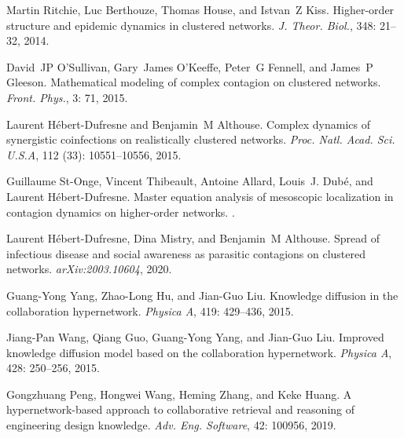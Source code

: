 Martin Ritchie, Luc Berthouze, Thomas House, and Istvan~Z Kiss.
\newblock Higher-order structure and epidemic dynamics in clustered networks.
\newblock \emph{J. Theor. Biol.}, 348: 21--32, 2014.

David~JP O'Sullivan, Gary~James O'Keeffe, Peter~G Fennell, and James~P Gleeson.
\newblock Mathematical modeling of complex contagion on clustered networks.
\newblock \emph{Front. Phys.}, 3: 71, 2015.

Laurent H{\'e}bert-Dufresne and Benjamin~M Althouse.
\newblock Complex dynamics of synergistic coinfections on realistically
clustered networks.
\newblock \emph{Proc. Natl. Acad. Sci. U.S.A}, 112 (33):
10551--10556, 2015.

Guillaume {St-Onge}, Vincent Thibeault, Antoine Allard, Louis~J. Dub{\'e}, and
Laurent {H{\'e}bert-Dufresne}.
\newblock Master equation analysis of mesoscopic localization in contagion
dynamics on higher-order networks.
.

Laurent H{\'e}bert-Dufresne, Dina Mistry, and Benjamin~M Althouse.
\newblock Spread of infectious disease and social awareness as parasitic
contagions on clustered networks.
\newblock \emph{arXiv:2003.10604}, 2020.

Guang-Yong Yang, Zhao-Long Hu, and Jian-Guo Liu.
\newblock Knowledge diffusion in the collaboration hypernetwork.
\newblock \emph{Physica A}, 419: 429--436, 2015.

Jiang-Pan Wang, Qiang Guo, Guang-Yong Yang, and Jian-Guo Liu.
\newblock Improved knowledge diffusion model based on the collaboration
hypernetwork.
\newblock \emph{Physica A}, 428: 250--256, 2015{}.

Gongzhuang Peng, Hongwei Wang, Heming Zhang, and Keke Huang.
\newblock A hypernetwork-based approach to collaborative retrieval and
reasoning of engineering design knowledge.
\newblock \emph{Adv. Eng. Software}, 42: 100956, 2019.

